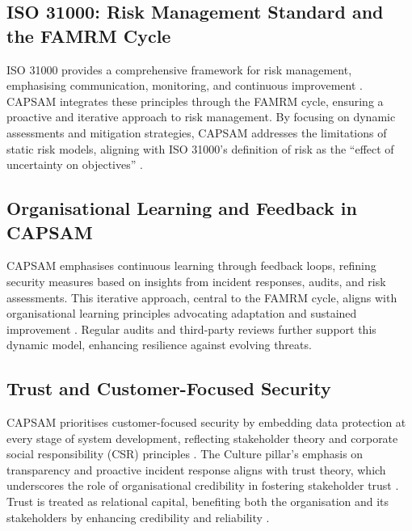     \subsection{ISO 31000: Risk Management Standard and the FAMRM Cycle}
    ISO 31000 provides a comprehensive framework for risk management, emphasising communication, monitoring, and continuous improvement \citep{purdy2010iso}. CAPSAM integrates these principles through the FAMRM cycle, ensuring a proactive and iterative approach to risk management. By focusing on dynamic assessments and mitigation strategies, CAPSAM addresses the limitations of static risk models, aligning with ISO 31000's definition of risk as the ``effect of uncertainty on objectives'' \citep{purdy2010iso}.
    
    \subsection{Organisational Learning and Feedback in CAPSAM}
    CAPSAM emphasises continuous learning through feedback loops, refining security measures based on insights from incident responses, audits, and risk assessments. This iterative approach, central to the FAMRM cycle, aligns with organisational learning principles advocating adaptation and sustained improvement \citep{murray2003continuous}. Regular audits and third-party reviews further support this dynamic model, enhancing resilience against evolving threats.
    
    \subsection{Trust and Customer-Focused Security}
    CAPSAM prioritises customer-focused security by embedding data protection at every stage of system development, reflecting stakeholder theory and corporate social responsibility (CSR) principles \citep{moir2001csr, parmar2010stakeholder}. The Culture pillar's emphasis on transparency and proactive incident response aligns with trust theory, which underscores the role of organisational credibility in fostering stakeholder trust \citep{castelfranchi2010trust}. Trust is treated as relational capital, benefiting both the organisation and its stakeholders by enhancing credibility and reliability \citep{castelfranchi2010trust}.
    
